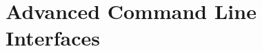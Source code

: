 \documentclass[titlepage,numbers=noenddot,headinclude,
                footinclude=true,abstractoff,
                BCOR=5mm,paper=letter,fontsize=11pt,
                ngerman,american,dottedtoc]{scrreprt}
\begin{document}
\part{Advanced Command Line Interfaces}




%
%
\appendix
\cleardoublepage
%
\printindex
\end{document}
